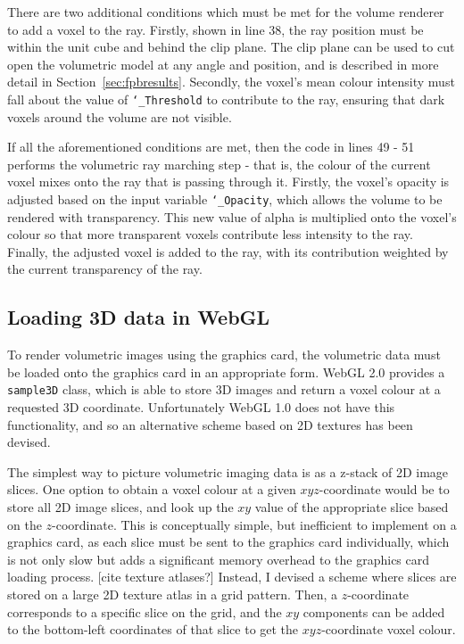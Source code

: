 There are two additional conditions which must be met for the volume renderer to add a voxel to the ray.
Firstly, shown in line 38, the ray position must be within the unit cube and behind the clip plane.
The clip plane can be used to cut open the volumetric model at any angle and position, and is described in more detail in Section~\ref{sec:fpbresults}.
Secondly, the voxel's mean colour intensity must fall about the value of \texttt{\char`_Threshold} to contribute to the ray, ensuring that dark voxels around the volume are not visible.

If all the aforementioned conditions are met, then the code in lines 49 - 51 performs the volumetric ray marching step - that is, the colour of the current voxel mixes onto the ray that is passing through it.
Firstly, the voxel's opacity is adjusted based on the input variable \texttt{\char`_Opacity}, which allows the volume to be rendered with transparency.
This new value of alpha is multiplied onto the voxel's colour so that more transparent voxels contribute less intensity to the ray.
Finally, the adjusted voxel is added to the ray, with its contribution weighted by the current transparency of the ray.

\subsection{Loading 3D data in WebGL} \label{sec:fpbVolumeRendering}
To render volumetric images using the graphics card, the volumetric data must be loaded onto the graphics card in an appropriate form.
WebGL 2.0 provides a \texttt{sample3D} class, which is able to store 3D images and return a voxel colour at a requested 3D coordinate.
Unfortunately WebGL 1.0 does not have this functionality, and so an alternative scheme based on 2D textures has been devised.

The simplest way to picture volumetric imaging data is as a z-stack of 2D image slices.
One option to obtain a voxel colour at a given $xyz$-coordinate would be to store all 2D image slices, and look up the $xy$ value of the appropriate slice based on the $z$-coordinate.
This is conceptually simple, but inefficient to implement on a graphics card, as each slice must be sent to the graphics card individually, which is not only slow but adds a significant memory overhead to the graphics card loading process. [cite texture atlases?]
Instead, I devised a scheme where slices are stored on a large 2D texture atlas in a grid pattern.
Then, a $z$-coordinate corresponds to a specific slice on the grid, and the $xy$ components can be added to the bottom-left coordinates of that slice to get the $xyz$-coordinate voxel colour.

